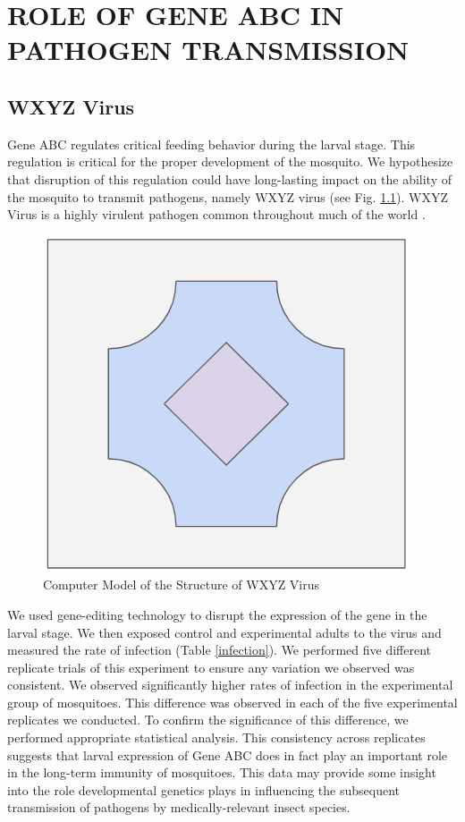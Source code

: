 \chapter{ROLE OF GENE ABC IN PATHOGEN TRANSMISSION}

\section{WXYZ Virus}

Gene ABC regulates critical feeding behavior during the larval stage. This regulation is critical for the proper development of the mosquito. We hypothesize that disruption of this regulation could have long-lasting impact on the ability of the mosquito to transmit pathogens, namely WXYZ virus (see Fig. \ref{fig:virus}). WXYZ Virus is a highly virulent pathogen common throughout much of the world \citep{chen2023}. 
\begin{figure}[h!]
    \centering
    \includegraphics[width=0.5\linewidth]{Images/virus.png}
    \caption{Computer Model of the Structure of WXYZ Virus}
    \label{fig:virus}
\end{figure}
We used gene-editing technology to disrupt the expression of the gene in the larval stage. We then exposed control and experimental adults to the virus and measured the rate of infection (Table \ref{infection}). We performed five different replicate trials of this experiment to ensure any variation we observed was consistent. We observed significantly higher rates of infection in the experimental group of mosquitoes. This difference was observed in each of the five experimental replicates we conducted. To confirm the significance of this difference, we performed appropriate statistical analysis. This consistency across replicates suggests that larval expression of Gene ABC does in fact play an important role in the long-term immunity of mosquitoes. This data may provide some insight into the role developmental genetics plays in influencing the subsequent transmission of pathogens by medically-relevant insect species.

